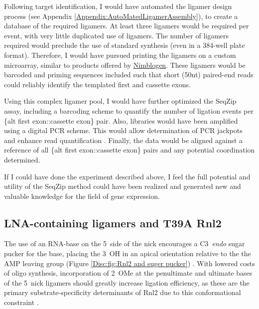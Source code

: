     Following target identification, I would have automated the ligamer design process (see Appendix \ref{Appendix:AutoMatedLigamerAssembly}), to create a database of the required ligamers. At least three ligamers would be required per event, with very little duplicated use of ligamers. The number of ligamers required would preclude the use of standard synthesis (even in a 384-well plate format). Therefore, I would have pursued printing the ligamers on a custom microarray, similar to products offered by \href{http://www.nimblegen.com/}{Nimblogen}. These ligamers would be barcoded and priming sequences included such that short (50nt) paired-end reads could reliably identify the templated first and cassette exons. 

    Using this complex ligamer pool, I would have further optimized the SeqZip assay, including a barcoding scheme to quantify the number of ligation events per \{alt first exon::cassette exon\} pair. Also, libraries would have been amplified using a digital PCR scheme. This would allow determination of PCR jackpots and enhance read quantification \citep{Shiroguchi2012a}. Finally, the data would be aligned against a reference of all \{alt first exon::cassette exon\} pairs and any potential coordination determined.

    If I could have done the experiment described above, I feel the full potential and utility of the SeqZip method could have been realized and generated new and valuable knowledge for the field of gene expression.

  \subsection{LNA-containing ligamers and T39A Rnl2}
    \label{Disc:subsec:LNA-Containing ligamers and T39A Rnk2}

    The use of an RNA-base on the 5\textprime~side of the nick encourages a C3\textprime~\textit{endo} sugar pucker for the base, placing the 3\textprime~OH in an apical orientation relative to the the AMP leaving group (Figure \ref{Disc:fig:Rnl2 and suger pucker}) \citep{Nandakumar2006}. With lowered costs of oligo synthesis, incorporation of 2\textprime~OMe at the penultimate and ultimate bases of the 5\textprime~nick ligamers should greatly increase ligation efficiency, as these are the primary substrate-specificity determinants of Rnl2 due to this conformational constraint \citep{Nandakumar2004a, Nandakumar2006}.


